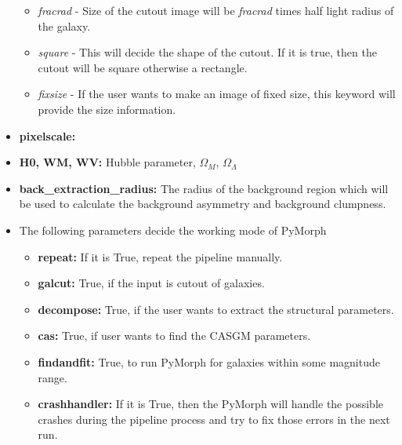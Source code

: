 \documentclass[a4paper,10pt]{article}
\begin{document}
\begin{itemize}
\begin{itemize}
\item \textit{fracrad} -  Size of the cutout image will be\textit{ fracrad} times half light radius of the
 galaxy.

\item \textit{square} - This will decide the shape of the cutout. If it is true, then the cutout will be square otherwise a rectangle.

\item \textit{ fixsize} - If the user wants to make an image of fixed size,
 this keyword will provide the size information.
\end{itemize}

\item \textbf{pixelscale:}
\item \textbf{H0, WM, WV:} Hubble parameter, $\Omega_M$, $\Omega_\Lambda$

\item \textbf{back\_extraction\_radius:} The radius of the background region which will be used to calculate the background asymmetry and background clumpness.


\item The following parameters decide the working mode of PyMorph
\begin{itemize}
\item[] \textbf{repeat:} If it is True, repeat the pipeline manually.
\item[] \textbf{galcut:} True, if the input is cutout of galaxies.
\item[] \textbf{decompose:} True, if the user wants to extract the structural parameters.
\item[] \textbf{cas:} True, if user wants to find the CASGM parameters.
\item[] \textbf{findandfit:} True, to run PyMorph for galaxies within some magnitude range.
\item[] \textbf{crashhandler:} If it is True, then the PyMorph will handle the possible crashes during the pipeline process and try to fix those  errors in the next run. %
\end{itemize}


\end{itemize}
\end{document}
